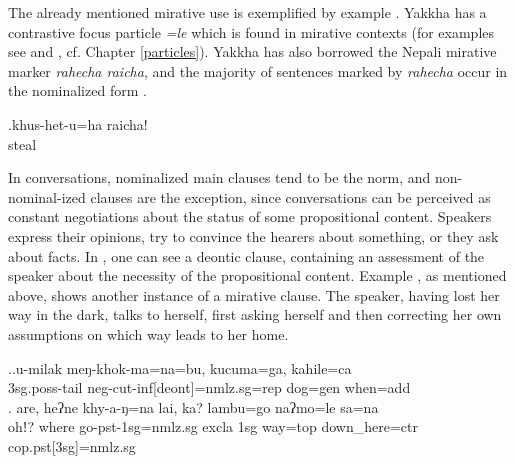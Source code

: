 The already mentioned mirative use is exemplified by example \Next. Yakkha has a contrastive focus particle \emph{=le} which is found in mirative contexts (for  examples see \Last[b] and \NNext[b], cf. Chapter \ref{particles}). Yakkha has also borrowed the Nepali mirative marker \emph{rahecha \ti raicha}, and the  majority of sentences marked by \emph{rahecha} occur in the nominalized form \Next.


\exg.khus-het-u=ha   raicha!\\
steal  \\
 


In conversations, nominalized main clauses tend to be  the norm, and non-nominal-ized clauses are the exception, since conversations can be perceived as constant negotiations about the status of some propositional content. Speakers express their opinions, try to convince the hearers about something, or they ask about facts. In \Next[a], one can see a deontic clause, containing an assessment of the speaker about the necessity of the propositional content. Example \Next[b], as mentioned above, shows another instance of a mirative clause. The speaker, having lost her way in the dark, talks to herself, first asking herself and then correcting her own assumptions on which way leads to her home. 

 
\ex.\ag.u-milak          meŋ-khok-ma=na=bu,                       kucuma=ga,   kahile=ca\\
{\sc 3sg.poss-}tail  {\sc neg-}cut{\sc -inf[deont]=nmlz.sg=rep}  dog{\sc =gen} when{\sc =add}\\
\bg. are,   heʔne khy-a-ŋ=na lai,        ka? lambu=go     naʔmo=le             sa=na\\
ohǃ?  where  go{\sc -pst-1sg=nmlz.sg} {\sc excla} {\sc 1sg} way{\sc =top} down\_here{\sc =ctr} {\sc cop.pst[3sg]=nmlz.sg}\\



